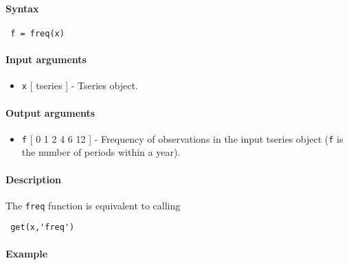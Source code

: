 


	\paragraph{Syntax}
 
 \begin{verbatim}
 f = freq(x)
 \end{verbatim}
 
 \paragraph{Input arguments}
 
 \begin{itemize}
 \item
   \texttt{x} {[} tseries {]} - Tseries object.
 \end{itemize}
 
 \paragraph{Output arguments}
 
 \begin{itemize}
 \item
   \texttt{f} {[} 0 \textbar{} 1 \textbar{} 2 \textbar{} 4 \textbar{} 6
   \textbar{} 12 {]} - Frequency of observations in the input tseries
   object (\texttt{f} is the number of periods within a year).
 \end{itemize}
 
 \paragraph{Description}
 
 The \texttt{freq} function is equivalent to calling
 
 \begin{verbatim}
 get(x,'freq')
 \end{verbatim}
 
 \paragraph{Example}


